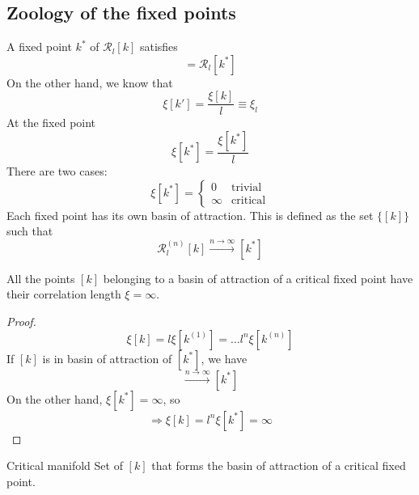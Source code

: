\documentclass[../main/main.tex]{subfiles}
\begin{document}
 \subsection{Zoology of the fixed points}
 A fixed point \( k^* \) of \( \mathcal{R}_l [k] \) satisfies
 \begin{equation}
   [k^*] = \mathcal{R}_l [k^*]
 \end{equation}
On the other hand, we know that
\begin{equation}
  \xi [k'] = \frac{\xi [k]}{l} \equiv \xi _l
 \end{equation}
At the fixed point
\begin{equation}
  \xi [k^*] = \frac{\xi [k^*]}{l}
\end{equation}
There are two cases:
\begin{equation}
  \xi [k^*] =
  \begin{cases}
   0 & \text{trivial}\\
   \infty & \text{critical}
  \end{cases}
\end{equation}
Each fixed point has its own basin of attraction. This is defined as the set \( \{ [k] \}   \) such that
\begin{equation}
  \mathcal{R}_l^{(n)} [k] \overset{n \rightarrow \infty }{\longrightarrow} [k^*]
\end{equation}
\begin{theorem}{}{}
All the points \([k]  \) belonging to a basin of attraction of a critical fixed point have their correlation length \( \xi = \infty  \).
\end{theorem}
\begin{proof}
\begin{equation}
  \xi [k] = l \xi [k^{(1)}] = \dots l^n \xi [ k^{(n)}]
\end{equation}
If \( [k] \) is in basin of attraction of \( [k^*] \), we have
\begin{equation}
  [k^{(n)}] \overset{n \rightarrow \infty }{\longrightarrow} [k^*]
\end{equation}
On the other hand, \( \xi [k^*] = \infty  \), so
\begin{equation}
  \Rightarrow \xi [k] = l^n \xi [k^*] = \infty
\end{equation}
\end{proof}
\begin{definition}{Critical manifold}{}
 Set of \( [k] \) that forms the basin of attraction of a critical fixed point.
\end{definition}
\end{document}
